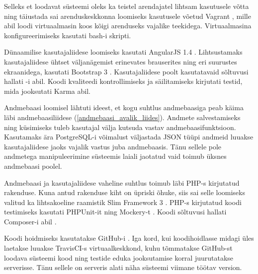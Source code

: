 \documentclass[a4paper,12pt]{article} %
\begin{document}
Selleks et loodavat süsteemi oleks ka teistel arendajatel lihtsam kasutusele võtta ning täiustada sai arenduskeskkonna loomiseks kasutusele võetud Vagrant \cite{Vagrant}, mille abil loodi virtuaalmasin koos kõigi arenduseks vajalike teekidega. Virtuaalmasina konfigureerimiseks kasutati bash-i skripti.\par

Dünaamilise kasutajaliidese loomiseks kasutati AngularJS 1.4 \cite{AngularJS}. Lihtsustamaks kasutajaliidese ühtset väljanägemist erinevates brauserites ning eri suurustes ekraanidega, kasutati Bootstrap 3 \cite{Bootstrap}. Kasutajaliidese poolt kasutatavaid sõltuvusi hallati \cite{Bower}-i abil. Koodi kvaliteedi kontrollimiseks ja säilitamiseks kirjutati testid, mida jooksutati Karma \cite{Karma} abil.\par

Andmebaasi loomisel lähtuti ideest, et kogu suhtlus andmebaasiga peab käima läbi andmebaasiliidese (\ref{andmebaasi_avalik_liides}). Andmete salvestamiseks ning küsimiseks tuleb kasutajal välja kutsuda vastav andmebaasifunktsioon. Kasutamaks ära PostgreSQL-i \cite{PostgreSQL} võimalust väljastada JSON tüüpi andmeid luuakse kasutajaliidese jaoks vajalik vastus juba andmebaasis. Tänu sellele pole andmetega manipuleerimine süsteemis laiali jaotatud vaid toimub üksnes andmebaasi poolel.\par

Andmebaasi ja kasutajaliidese vaheline suhtlus toimub läbi PHP-s \cite{PHP} kirjutatud rakenduse. Kuna antud rakenduse kiht on üpriski õhuke, siis sai selle loomiseks valitud ka lihtsakoeline raamistik Slim Framework 3 \cite{SlimFW}. PHP-s kirjutatud koodi testimiseks kasutati PHPUnit-it \cite{PHPUnit} ning Mockery-t \cite{Mockery}. Koodi sõltuvusi hallati Composer-i abil \cite{Composer}. \par

Koodi hoidmiseks kasutatakse GitHub-i \cite{GitHub}. Iga kord, kui koodihoidlasse midagi üles laetakse luuakse TravisCI-s \cite{TravisCI} virtuaalkeskkond, kuhu tõmmatakse GitHub-st loodava süsteemi kood ning testide eduka jooksutamise korral juurutatakse serverisse. Tänu sellele on serveris alati näha süsteemi viimane töötav version.
\end{document}
